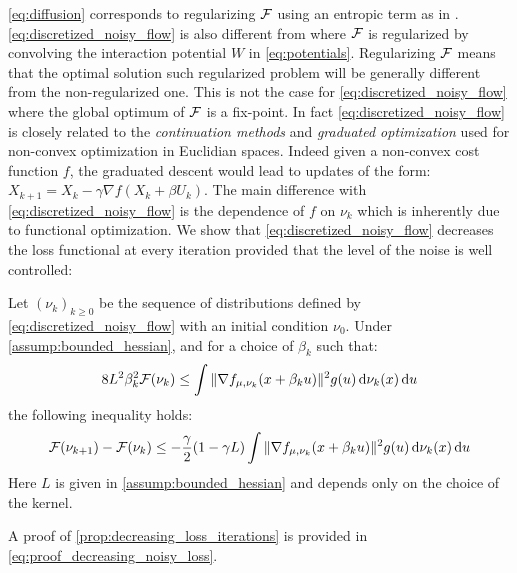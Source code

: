  \cref{eq:diffusion} corresponds to regularizing ${{\mathcal F}}$ using an entropic term as in \cite{mei2018mean,Simsekli:2018}. \cref{eq:discretized_noisy_flow} is also different from \cite{craig2016blob,carrillo2019blob} where ${{\mathcal F}}$ is regularized by convolving the interaction potential $W$ in \cref{eq:potentials}. Regularizing ${{\mathcal F}}$ means that the optimal solution such regularized problem will be generally different from the non-regularized one. This is not the case for \cref{eq:discretized_noisy_flow} where the global optimum of ${{\mathcal F}}$ is a fix-point. 
In fact \cref{eq:discretized_noisy_flow} is  closely related to the \textit{continuation methods} \cite{Gulcehre:2016a,Gulcehre:2016,Chaudhari:2017}  and \textit{graduated optimization}\cite{Hazan:2015} used for non-convex optimization in Euclidian spaces. Indeed given a non-convex cost function $f$, the graduated descent would lead to updates of the form: $X_{k+1} = X_k - \gamma \nabla f(X_k+\beta U_k )$. The main difference with \cref{eq:discretized_noisy_flow} is the dependence of $f$ on $\nu_k$ which is inherently due to functional optimization.
We show that \cref{eq:discretized_noisy_flow} decreases the loss functional at every iteration provided that the level of the noise is well controlled:
\begin{proposition}\label{prop:decreasing_loss_iterations}
	Let $(\nu_k)_{k\geq 0}$ be the sequence of distributions defined by \cref{eq:discretized_noisy_flow} with an initial condition $\nu_0$. Under \cref{assump:bounded_hessian}, and for a choice of $\beta_k$ such that:
	\begin{align}\label{eq:control_level_noise}
		8L^2\beta_k^2 {{\mathcal F}}(\nu_k) \leq \int \Vert \nabla f_{\mu,\nu_k}(x+\beta_k u) \Vert^2 g(u) \mathop{}\!\mathrm{d} \nu_k(x)\mathop{}\!\mathrm{d} u   
	\end{align}
	 the following inequality holds:
	\begin{align}\label{eq:decreasing_loss_iterations}
		{{\mathcal F}}(\nu_{k+1}) - {{\mathcal F}}(\nu_k  ) \leq -\frac{\gamma}{2}(1-\gamma L)\int \Vert \nabla f_{\mu,\nu_k}(x+\beta_k u) \Vert^2 g(u) \mathop{}\!\mathrm{d}\nu_k(x) \mathop{}\!\mathrm{d} u
	\end{align}
	Here $L$ is given in \cref{assump:bounded_hessian} and depends only on the choice of the kernel.
\end{proposition}
A proof of \cref{prop:decreasing_loss_iterations} is provided in \cref{eq:proof_decreasing_noisy_loss}.

